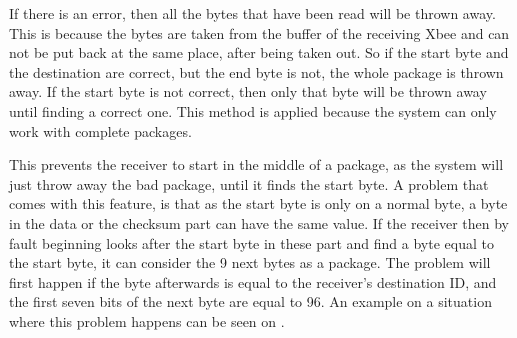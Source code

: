 If there is an error, then all the bytes that have been read will be thrown away. This is because the bytes are taken from the buffer of the receiving Xbee and can not be put back at the same place, after being taken out. So if the start byte and the destination are correct, but the end byte is not, the whole package is thrown away. If the start byte is not correct, then only that byte will be thrown away until finding a correct one. This method is applied because the system can only work with complete packages.

This prevents the receiver to start in the middle of a package, as the system will just throw away the bad package, until it finds the start byte. A problem that comes with this feature, is that as the start byte is only on a normal byte, a byte in the data or the checksum part can have the same value. If the receiver then by fault beginning looks after the start byte in these part and find a byte equal to the start byte, it can consider the 9 next bytes as a package. The problem will first happen if the byte afterwards is equal to the receiver's destination ID, and the first seven bits of the next byte are equal to 96. An example on a situation where this problem happens can be seen on .

